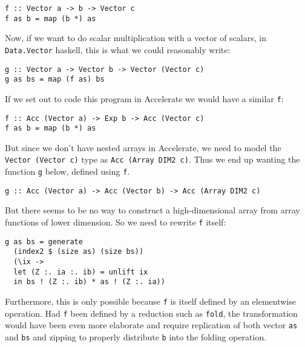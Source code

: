 \begin{verbatim}
f :: Vector a -> b -> Vector c
f as b = map (b *) as
\end{verbatim}

Now, if we want to do scalar multiplication with a vector of scalars, in
\texttt{Data.Vector} haskell, this is what we could reasonably write:

\begin{verbatim}
g :: Vector a -> Vector b -> Vector (Vector c)
g as bs = map (f as) bs
\end{verbatim}

If we set out to code this program in Accelerate we would have a similar
\texttt{f}:

\begin{verbatim}
f :: Acc (Vector a) -> Exp b -> Acc (Vector c)
f as b = map (b *) as
\end{verbatim}

But since we don't have nested arrays in Accelerate, we need to model the
\texttt{Vector (Vector c)} type  as \texttt{Acc (Array DIM2 c)}. Thus we end up
wanting the function \texttt{g} below, defined using \texttt{f}.

\begin{verbatim}
g :: Acc (Vector a) -> Acc (Vector b) -> Acc (Array DIM2 c)
\end{verbatim}

But there seems to be no way to construct a high-dimensional array from array
functions of lower dimension. So we need to rewrite \texttt{f} itself:

\begin{verbatim}
g as bs = generate
  (index2 $ (size as) (size bs))
  (\ix ->
  let (Z :. ia :. ib) = unlift ix
  in bs ! (Z :. ib) * as ! (Z :. ia))
\end{verbatim}

Furthermore, this is only possible because \texttt{f} is itself defined by an
elementwise operation. Had \texttt{f} been defined by a reduction such as
\texttt{fold}, the transformation would have been even more elaborate and
require replication of both vector \texttt{as} and \texttt{bs} and zipping to
properly distribute \texttt{b} into the folding operation.


